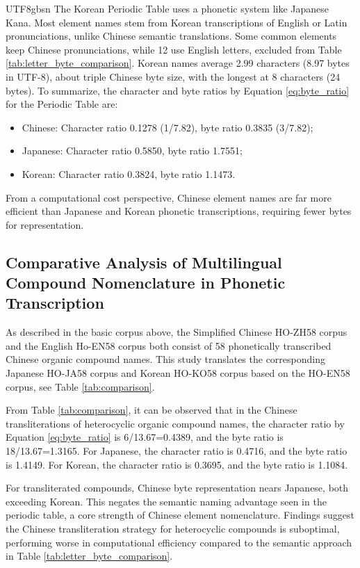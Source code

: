 \documentclass[conference]{IEEEtran}
\begin{document}
\begin{CJK*}{UTF8}{gbsn}
The Korean Periodic Table uses a phonetic system like Japanese Kana. Most element names stem from Korean transcriptions of English or Latin pronunciations, unlike Chinese semantic translations. Some common elements keep Chinese pronunciations, while 12 use English letters, excluded from Table \ref{tab:letter_byte_comparison}. Korean names average 2.99 characters (8.97 bytes in UTF-8), about triple Chinese byte size, with the longest at 8 characters (24 bytes). To summarize, the character and byte ratios by Equation \ref{eq:byte_ratio}  for the Periodic Table are:
 
\begin{itemize}
 \item Chinese: Character ratio 0.1278 (1/7.82), byte ratio 0.3835 (3/7.82); 
 \item Japanese: Character ratio 0.5850, byte ratio 1.7551; 
 \item Korean: Character ratio 0.3824, byte ratio 1.1473.

\end{itemize}

From a computational cost perspective, Chinese element names are far more efficient than Japanese and Korean phonetic transcriptions, requiring fewer bytes for representation.

\subsection{Comparative Analysis of Multilingual Compound Nomenclature in Phonetic Transcription} 
As described in the basic corpus above, the Simplified Chinese HO-ZH58 corpus and the English Ho-EN58 corpus both consist of 58 phonetically transcribed Chinese organic compound names. This study translates the corresponding Japanese HO-JA58 corpus and Korean HO-KO58 corpus based on the HO-EN58 corpus, see Table \ref{tab:comparison}. %


From Table \ref{tab:comparison}, it can be observed that in the Chinese transliterations of heterocyclic organic compound names, the character ratio by Equation \ref{eq:byte_ratio} is 6/13.67=0.4389, and the byte ratio is 18/13.67=1.3165. For Japanese, the character ratio is 0.4716, and the byte ratio is 1.4149. For Korean, the character ratio is 0.3695, and the byte ratio is 1.1084.

For transliterated compounds, Chinese byte representation nears Japanese, both exceeding Korean. This negates the semantic naming advantage seen in the periodic table, a core strength of Chinese element nomenclature. Findings suggest the Chinese transliteration strategy for heterocyclic compounds is suboptimal, performing worse in computational efficiency compared to the semantic approach in Table \ref{tab:letter_byte_comparison}.


\end{CJK*}
\end{document}
